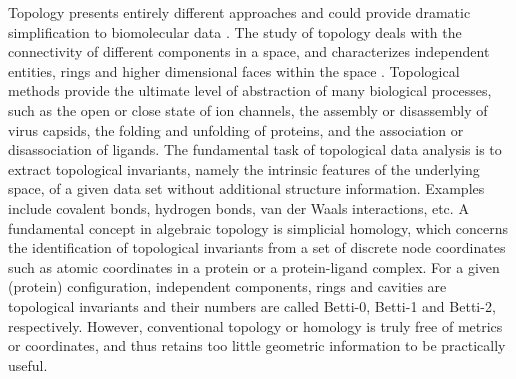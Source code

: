 \documentclass[10pt]{article}
\begin{document}
Topology presents entirely different approaches and could provide dramatic simplification to biomolecular data \cite{Schlick:1992trefoil,Zomorodian:2005,sumners:1992,IKDarcy:2013,CHeitsch:2014,Demerdash:2009,DasGupta2016,XShi:2011}. 
The study of topology   deals with the connectivity of different components in a space, and  characterizes independent entities,  rings and higher dimensional faces within the space \cite{kaczynski:mischaikow:mrozek:04}. Topological methods provide the ultimate level of abstraction of many biological processes, such as the  open or close state of ion channels, the assembly or disassembly of virus capsids, the folding and unfolding of proteins, and the association or disassociation of ligands. 
The fundamental task of topological data analysis is to extract topological invariants, namely the intrinsic features of the underlying space, of a given data set without additional structure information. Examples include covalent bonds, hydrogen bonds, van der Waals interactions, etc.
A fundamental  concept in  algebraic topology is simplicial homology, which concerns the identification of topological invariants from a set of discrete node coordinates such as atomic coordinates in a protein  or a protein-ligand complex. For a given (protein)  configuration, independent components, rings and cavities are topological invariants and their numbers  are called Betti-0, Betti-1 and Betti-2, respectively.
However, conventional topology or homology is truly free of metrics or coordinates, and thus retains too little geometric information to be practically useful. 
\end{document}
